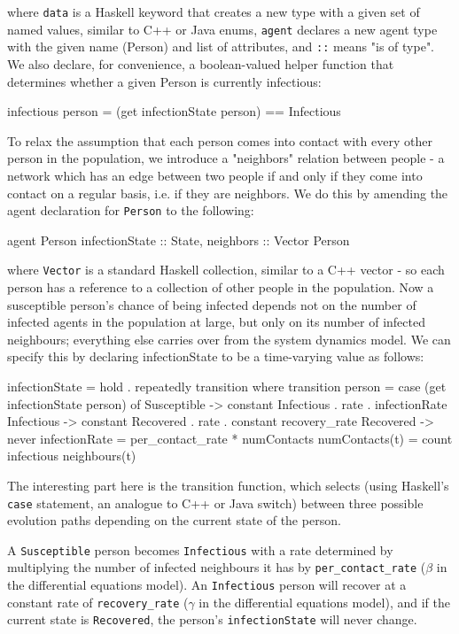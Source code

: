 \documentclass{llncs}
\begin{document}
where \lstinline{data} is a Haskell keyword that creates a new type with a given set of named values, similar to C++ or Java enums, \lstinline{agent} declares a new agent type with the given name (Person) and list of attributes, and \lstinline{::} means "is of type".  We also declare, for convenience, a boolean-valued helper function that determines whether a given Person is currently infectious: 
\begin{code}
infectious person = (get infectionState person) == Infectious
\end{code}
 
 To relax the assumption that each person comes into contact with every other person in the population, we introduce a "neighbors" relation between people - a network which has an edge between two people if and only if they come into contact on a regular basis, i.e. if they are neighbors. We do this by amending the agent declaration for \lstinline{Person} to the following: 
\begin{code}
agent Person { infectionState :: State, neighbors :: Vector Person} 
\end{code}
 where \lstinline{Vector} is a standard Haskell collection, similar to a C++ vector - so each person has a reference to a collection of other people in the population. 
  Now a susceptible person's chance of being infected depends not on the number of infected agents in the population at large, but only on its number of infected neighbours; everything else carries over from the system dynamics model. We can specify this by declaring infectionState to be a time-varying value as follows: 
\begin{code}
infectionState = hold . repeatedly transition  
    where
	transition person = 
	   case (get infectionState person) of 
             Susceptible -> constant Infectious . rate . 
             			infectionRate
             Infectious -> constant Recovered . rate . 
             			constant recovery_rate
             Recovered -> never 
	infectionRate = per_contact_rate * numContacts 
        numContacts(t) = count infectious neighbours(t)
\end{code}
The interesting part here is the transition function, which selects (using Haskell's \lstinline{case} statement, an analogue to C++ or Java switch) between three possible evolution paths depending on the current state of the person. 

   A \lstinline{Susceptible} person becomes \lstinline{Infectious} with a rate determined by multiplying the number of infected neighbours it has by \lstinline{per_contact_rate} ($\beta$ in the differential equations model). An \lstinline{Infectious} person will recover at a constant rate of \lstinline{recovery_rate} ($\gamma$ in the differential equations model), and if the current state is \lstinline{Recovered}, the person's \lstinline{infectionState} will never change. 
   
\end{document}

